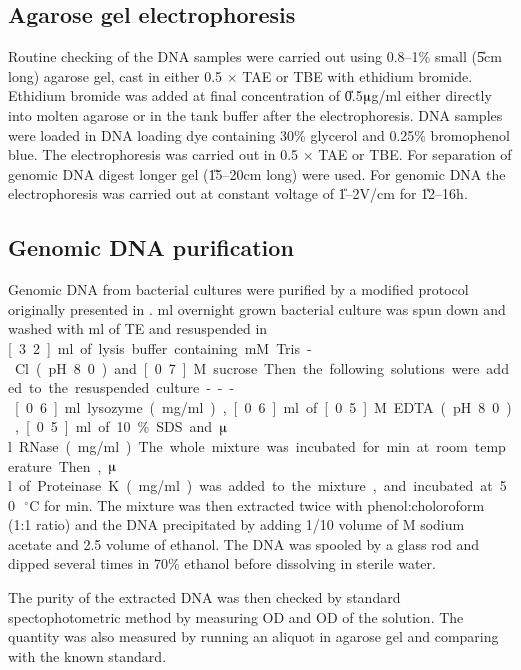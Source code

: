 \subsection{Agarose gel electrophoresis}

Routine checking of the DNA samples were carried out using
0.8--1\% small (\U{5}{cm} long) agarose gel, cast in either 0.5
$\times$ TAE or TBE with  ethidium bromide. Ethidium bromide was
added at final concentration of \U{0.5}{$\muup$g/ml} either
directly into molten agarose or in the tank buffer after the
electrophoresis. DNA samples were loaded in DNA loading dye
containing 30\% glycerol and 0.25\% bromophenol blue. The
electrophoresis was carried out in 0.5 $\times$ TAE or TBE. For
separation of genomic DNA digest longer gel (\U{15--20}{cm} long)
were used. For genomic DNA the electrophoresis was carried out at
constant voltage of \U{1--2}{V/cm} for \U{12--16}{h}.


\subsection{Genomic DNA purification}

Genomic DNA from bacterial cultures were purified by a modified
protocol originally presented in \citet{Towner1991}.
\unit[100]{ml} overnight grown bacterial culture was spun down and
washed with \unit[40]{ml} of TE and resuspended in \unit[3.2]{ml}
of lysis buffer containing \unit[50]{mM} Tris-Cl (pH 8.0) and
\unit[0.7]{M} sucrose. Then the following solutions were added to
the resuspended culture--- \unit[0.6]{ml} lysozyme
(\unit[20]{mg/ml}), \unit[0.6]{ml} of \unit[0.5]{M} EDTA (pH 8.0),
\unit[0.5]{ml} of 10\% SDS and \unit[5]{$\muup$l} RNase
(\unit[100]{mg/ml}). The whole mixture was incubated for
\unit[10]{min} at room temperature. Then, \unit[250]{$\muup$l} of
Proteinase K (\unit[10]{mg/ml}) was added to the mixture, and
incubated at 50\,$^\circ$C for \unit[30]{min}. The mixture was
then extracted twice with phenol:choloroform (1:1 ratio) and the
DNA precipitated by adding 1/10 volume of \unit[3]{M}
sodium acetate and 2.5 volume of ethanol. The DNA was spooled by a
glass rod and dipped several times in 70\% ethanol before
dissolving in sterile water.

The purity of the extracted DNA was then checked by standard
spectophotometric method by measuring OD and OD
of the solution. The quantity was also measured by running an
aliquot in agarose gel and comparing with the known standard.

